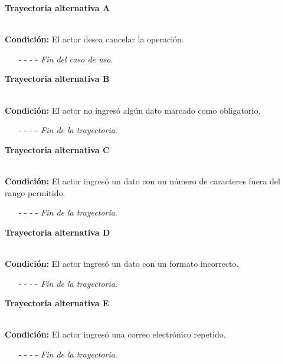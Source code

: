 	\hypertarget{CU3-2:TAA}{\textbf{Trayectoria alternativa A}}\\
	\noindent \textbf{Condición:} El actor desea cancelar la operación.
	\begin{enumerate}
		\UCpaso[\UCactor] Solicita cancelar la operación oprimiendo el botón  de la pantalla .
		\UCpaso[\UCsist] Muestra la pantalla .
		\item[- -] - - {\em {Fin del caso de uso}}.%
	\end{enumerate}
\hypertarget{CU3-2:TAB}{\textbf{Trayectoria alternativa B}}\\
\noindent \textbf{Condición:} El actor no ingresó algún dato marcado como obligatorio.
\begin{enumerate}
	\UCpaso[\UCsist] Muestra el mensaje  señalando el campo que presenta el error en la pantalla .
	\UCpaso Regresa al paso \ref{CU3.2-P5} de la trayectoria principal.
	\item[- -] - - {\em {Fin de la trayectoria}}.%
\end{enumerate}
\hypertarget{CU3-2:TAC}{\textbf{Trayectoria alternativa C}}\\
\noindent \textbf{Condición:} El actor ingresó un dato con un número de caracteres fuera del rango permitido.
\begin{enumerate}
	\UCpaso[\UCsist] Muestra el mensaje  señalando el campo que presenta el error en la pantalla .
	\UCpaso Regresa al paso \ref{CU3.2-P5} de la trayectoria principal.
	\item[- -] - - {\em {Fin de la trayectoria}}.%
\end{enumerate}
\hypertarget{CU3-2:TAD}{\textbf{Trayectoria alternativa D}}\\
\noindent \textbf{Condición:} El actor ingresó un dato con un formato incorrecto.
\begin{enumerate}
	\UCpaso[\UCsist] Muestra el mensaje  señalando el campo que presenta el error en la pantalla .
	\UCpaso Regresa al paso \ref{CU3.2-P5} de la trayectoria principal.
	\item[- -] - - {\em {Fin de la trayectoria}}.
\end{enumerate}
\hypertarget{CU3-2:TAE}{\textbf{Trayectoria alternativa E}}\\
\noindent \textbf{Condición:} El actor ingresó una correo electrónico repetido.
\begin{enumerate}
	\UCpaso[\UCsist] Muestra el mensaje  señalando el campo que presenta la duplicidad en la pantalla.
	\UCpaso Regresa al paso \ref{CU3.2-P5} de la trayectoria principal.
	\item[- -] - - {\em {Fin de la trayectoria}}.
\end{enumerate}

